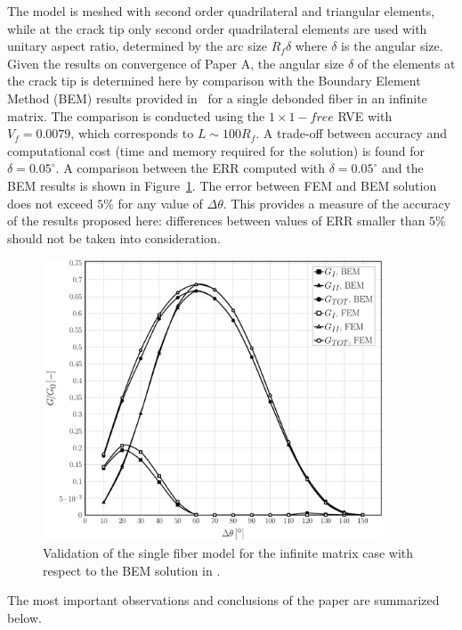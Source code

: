 The model is meshed with second order quadrilateral and triangular elements, while at the crack tip only second order quadrilateral elements are used with unitary aspect ratio, determined by the arc size $R_{f}\delta$ where $\delta$ is the angular size. Given the results on convergence of Paper A, the angular size $\delta$ of the elements at the crack tip is determined here by comparison with the Boundary Element Method (BEM) results provided in~\cite{Paris2007,Sandino2016} for a single debonded fiber in an infinite matrix. The comparison is conducted using the $1\times1-free$ RVE with $V_{f}=0.0079$, which corresponds to $L\sim100 R_{f}$. A trade-off between accuracy and computational cost (time and memory required for the solution) is found for $\delta=0.05^{\circ}$. A comparison between the ERR computed with $\delta=0.05^{\circ}$ and the BEM results is shown in Figure~\ref{chap3:paperB:fig:validation}. The error between FEM and BEM solution does not exceed $5\%$ for any value of $\Delta\theta$. This provides a measure of the accuracy of the results proposed here: differences between values of ERR smaller than $5\%$ should not be taken into consideration.

\begin{figure}[!h]
\centering
\includegraphics[width=0.9\textwidth]{paperB/validation-VCCT.pdf}
\caption{Validation of the single fiber model for the infinite matrix case with respect to the BEM solution in \cite{Sandino2016}.}\label{chap3:paperB:fig:validation}
\end{figure}

The most important observations and conclusions of the paper are summarized below.

